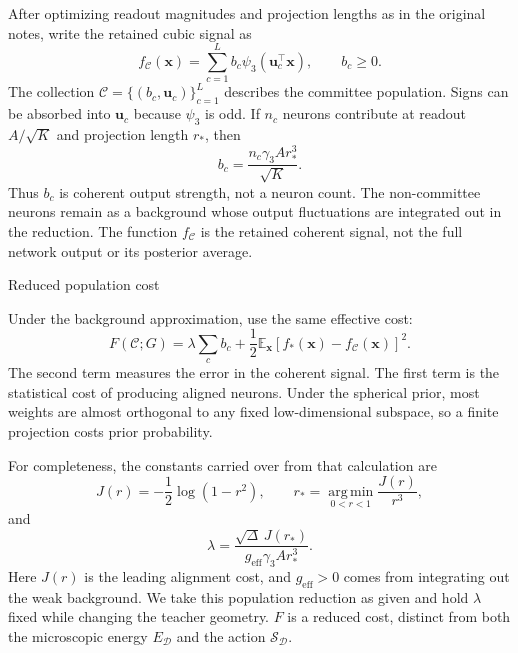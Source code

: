 \documentclass[11pt, reqno]{amsart}
\makeatletter
\def\section{\@startsection{section}{1}%
  \z@{.7\linespacing\@plus\linespacing}{.5\linespacing}%
  {\normalfont\scshape\centering}}
\theoremstyle{notestyle}
\theoremstyle{defstyle}
\newcommand{\argmin}{\operatorname*{arg\,min}}
\makeatother
\begin{document}
After optimizing readout magnitudes and projection lengths as in the
original notes, write the retained cubic signal as
\begin{equation}
 f_{\mathcal C}(\mathbf x)
 =\sum_{c=1}^L b_c\psi_3(\mathbf u_c^\top\mathbf x),
 \qquad b_c\geq0.
\end{equation}
The collection $\mathcal C=\{(b_c,\mathbf u_c)\}_{c=1}^L$ describes the
committee population. Signs can be absorbed into $\mathbf u_c$
because $\psi_3$ is odd. If $n_c$ neurons contribute at readout
$A/\sqrt K$ and projection length $r_*$, then
\begin{equation}
 b_c=\frac{n_c\gamma_3Ar_*^3}{\sqrt K}.
\end{equation}
Thus $b_c$ is coherent output strength, not a neuron count. The
non-committee neurons remain as a background whose output fluctuations
are integrated out in the reduction. The function $f_{\mathcal C}$
is the retained coherent signal, not the full network output or its
posterior average.

\section{Reduced population cost}

Under the background approximation, use the same effective cost:
\begin{equation}
 F(\mathcal C;G)=\lambda\sum_c b_c+
 \frac12\mathbb E_{\mathbf x}
 [f_*(\mathbf x)-f_{\mathcal C}(\mathbf x)]^2.
 \label{eq:iso-F}
\end{equation}
The second term measures the error in the coherent signal. The first
term is the statistical cost of producing aligned neurons. Under the
spherical prior, most weights are almost orthogonal to any fixed
low-dimensional subspace, so a finite projection costs prior
probability.

For completeness, the constants carried over from that calculation are
\begin{equation}
 J(r)=-\frac12\log(1-r^2),\qquad
 r_*=\argmin_{0<r<1}\frac{J(r)}{r^3},
\end{equation}
and
\begin{equation}
 \lambda=\frac{\sqrt\Delta\,J(r_*)}
 {g_{\mathrm{eff}}\gamma_3Ar_*^3}.
\end{equation}
Here $J(r)$ is the leading alignment cost, and $g_{\mathrm{eff}}>0$
comes from integrating out the weak background. We take this
population reduction as given and hold $\lambda$ fixed while changing
the teacher geometry. $F$ is a reduced cost, distinct from both the
microscopic energy $E_{\mathcal D}$ and the action
$\mathcal S_{\mathcal D}$.
\end{document}
